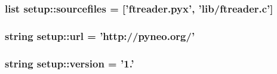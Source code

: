 \hypertarget{namespacesetup_a46318957478d47a26cf394c9cb6d6d8d}{
\subsubsection[{sourcefiles}]{\setlength{\rightskip}{0pt plus 5cm}list {\bf setup\-::sourcefiles} = \mbox{[}'ftreader.\-pyx', 'lib/ftreader.\-c'\mbox{]}}}\label{namespacesetup_a46318957478d47a26cf394c9cb6d6d8d}
\hypertarget{namespacesetup_a7c3763764f99123690822c047e74c36e}{
\subsubsection[{url}]{\setlength{\rightskip}{0pt plus 5cm}string {\bf setup\-::url} = 'http\-://pyneo.\-org/'}}\label{namespacesetup_a7c3763764f99123690822c047e74c36e}
\hypertarget{namespacesetup_a8b86ddd5b5591d99de08e584197a53d9}{
\subsubsection[{version}]{\setlength{\rightskip}{0pt plus 5cm}string {\bf setup\-::version} = '1.'}}\label{namespacesetup_a8b86ddd5b5591d99de08e584197a53d9}
